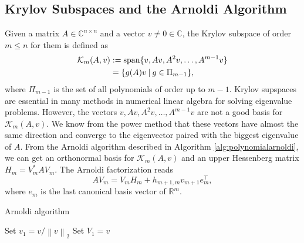 \subsection{Krylov Subspaces and the Arnoldi Algorithm}\label{sec:arnoldi}
Given a matrix $A \in \mathbb{C}^{n \times n}$ and a vector $v \neq 0 \in \mathbb{C}$,
the Krylov subspace of order $m \leq n$ for them is defined \cite{golub2013matrix} as
\begin{equation}
    \label{eq:krylovsubspacedefinition}
    \begin{aligned}
        \mathcal{K}_m(A, v) & := \operatorname{span}\{v, Av, A^{2}v, \dots, A^{m-1}v \}\\
         & = \{g(A)v \:|\: g \in \Pi_{m-1} \},
    \end{aligned}
\end{equation}
where $\Pi_{m-1}$ is the set of all polynomials of order up to $m-1$.
Krylov supspaces are essential in many methods in numerical linear algebra
for solving eigenvalue problems. However, the vectors $v, Av, A^{2}v, \dots, A^{m-1}v$
are not a good basis for $\mathcal{K}_m(A, v)$. We know from the power method that
these vectors have almost the same direction and converge to the eigenvector paired
with the biggest eigenvalue of $A$.
From the Arnoldi algorithm \cite{trefethen1997numerical} described in Algorithm
\ref{alg:polynomialarnoldi}, we can get an orthonormal basis for $\mathcal{K}_m(A, v)$
and an upper Hessenberg matrix $H_m = V_m^* A V_m$. The Arnoldi factorization reads
\begin{equation}
    \label{eq:arnoldifactorization}
    A V_m = V_m H_m + h_{m+1, m} v_{m+1} e_m^\top,
\end{equation}
where $e_m$ is the last canonical basis vector of $\mathbb{R}^{m}$.

\begin{algorithm}
    \caption{Arnoldi algorithm}
    \label{alg:polynomialarnoldi}
    Set $v_1 = v / \left\| v \right\|_2$\;
    Set $V_1 = v$\;
        \end{algorithm}

